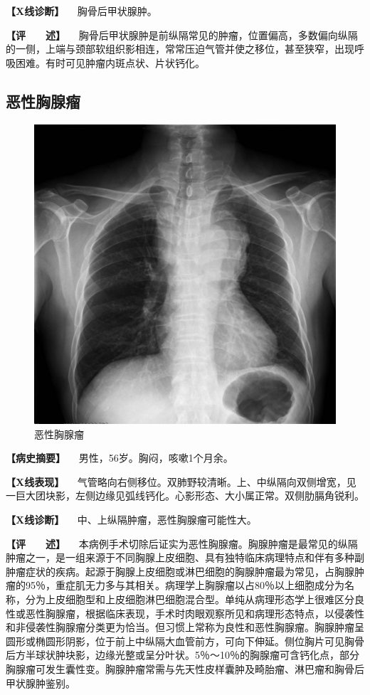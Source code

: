 \textbf{【X线诊断】} 　胸骨后甲状腺肿。

\textbf{【评　　述】}
　胸骨后甲状腺肿是前纵隔常见的肿瘤，位置偏高，多数偏向纵隔的一侧，上端与颈部软组织影相连，常常压迫气管并使之移位，甚至狭窄，出现呼吸困难。有时可见肿瘤内斑点状、片状钙化。

\subsection{恶性胸腺瘤}

\begin{figure}[!htbp]
 \centering
 \includegraphics{./images/Image00195.jpg}
 \captionsetup{justification=centering}
 \caption{恶性胸腺瘤}
 \label{fig3-12-2}
  \end{figure} 

\textbf{【病史摘要】} 　男性，56岁。胸闷，咳嗽1个月余。

\textbf{【X线表现】}
　气管略向右侧移位。双肺野较清晰。上、中纵隔向双侧增宽，见一巨大团块影，左侧边缘见弧线钙化。心影形态、大小属正常。双侧肋膈角锐利。

\textbf{【X线诊断】} 　中、上纵隔肿瘤，恶性胸腺瘤可能性大。

\textbf{【评　　述】}
　本病例手术切除后证实为恶性胸腺瘤。胸腺肿瘤是最常见的纵隔肿瘤之一，是一组来源于不同胸腺上皮细胞、具有独特临床病理特点和伴有多种副肿瘤症状的疾病。起源于胸腺上皮细胞或淋巴细胞的胸腺肿瘤最为常见，占胸腺肿瘤的95％，重症肌无力多与其相关。病理学上胸腺瘤以占80％以上细胞成分为名称，分为上皮细胞型和上皮细胞淋巴细胞混合型。单纯从病理形态学上很难区分良性或恶性胸腺瘤，根据临床表现，手术时肉眼观察所见和病理形态特点，以侵袭性和非侵袭性胸腺瘤分类更为恰当。但习惯上常称为良性和恶性胸腺瘤。胸腺肿瘤呈圆形或椭圆形阴影，位于前上中纵隔大血管前方，可向下伸延。侧位胸片可见胸骨后方半球状肿块影，边缘光整或呈分叶状。5％～10％的胸腺瘤可含钙化点，部分胸腺瘤可发生囊性变。胸腺肿瘤常需与先天性皮样囊肿及畸胎瘤、淋巴瘤和胸骨后甲状腺肿鉴别。

